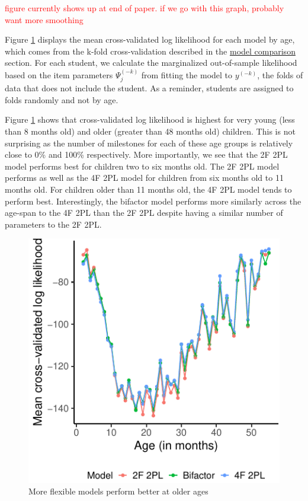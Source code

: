 \documentclass[10pt, letterpaper]{article}
\newenvironment{CodeChunk}{}{}
\begin{document}
\textcolor{red}{figure currently shows up at end of paper.}
\textcolor{red}{if we go with this graph,}
\textcolor{red}{probably want more smoothing}

Figure \ref{fig:byage} displays the mean cross-validated log likelihood
for each model by age, which comes from the k-fold cross-validation
described in the \protect\hyperlink{modelcompare}{model comparison}
section. For each student, we calculate the marginalized out-of-sample
likelihood based on the item parameters \(\Psi_j^{(-k)}\) from fitting
the model to \(y^{(-k)}\), the folds of data that does not include the
student. As a reminder, students are assigned to folds randomly and not
by age.

Figure \ref{fig:byage} shows that cross-validated log likelihood is
highest for very young (less than 8 months old) and older (greater than
48 months old) children. This is not surprising as the number of
milestones for each of these age groups is relatively close to 0\% and
100\% respectively. More importantly, we see that the 2F 2PL model
performs best for children two to six months old. The 2F 2PL model
performs as well as the 4F 2PL model for children from six months old to
11 months old. For children older than 11 months old, the 4F 2PL model
tends to perform best. Interestingly, the bifactor model performs more
similarly across the age-span to the 4F 2PL than the 2F 2PL despite
having a similar number of parameters to the 2F 2PL.

\begin{CodeChunk}
\begin{figure}[tb]
\includegraphics{figs/byage-1} \caption[More flexible models perform better at older ages]{More flexible models perform better at older ages}\label{fig:byage}
\end{figure}
\end{CodeChunk}
\end{document}
